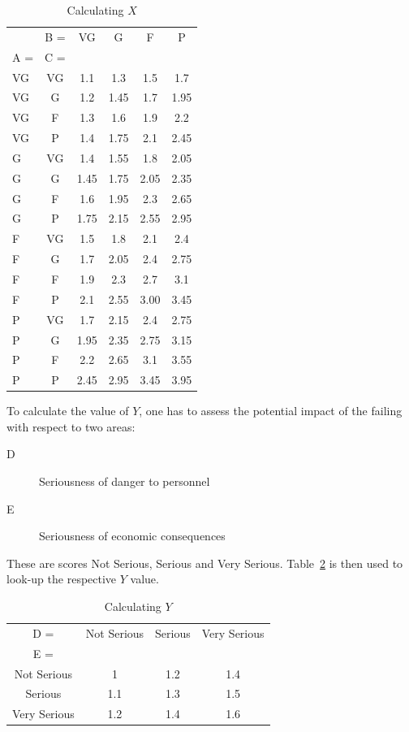 \begin{table}[h!]
  \caption{Calculating $X$}\label{tbl-pugsley-x}
  \center{}
  \begin{tabular}{l c | c c c c}
    \toprule
    & B = & VG & G & F & P \\
    A = & C = & & & & \\
    \midrule
    VG & VG & 1.1 & 1.3 & 1.5 & 1.7 \\
    VG & G & 1.2 & 1.45 & 1.7 & 1.95 \\
    VG & F & 1.3 & 1.6 & 1.9 & 2.2 \\
    VG & P & 1.4 & 1.75 & 2.1 & 2.45 \\
    \midrule
    G & VG & 1.4 & 1.55 & 1.8 & 2.05 \\
    G & G & 1.45 & 1.75 & 2.05 & 2.35 \\
    G & F & 1.6 & 1.95 & 2.3 & 2.65 \\
    G & P & 1.75 & 2.15 & 2.55 & 2.95 \\
    \midrule
    F & VG & 1.5 & 1.8 & 2.1 & 2.4 \\
    F & G & 1.7 & 2.05 & 2.4 & 2.75 \\
    F & F & 1.9 & 2.3 & 2.7 & 3.1 \\
    F & P & 2.1 & 2.55 & 3.00 & 3.45 \\
    \midrule
    P & VG & 1.7 & 2.15 & 2.4 & 2.75 \\
    P & G & 1.95 & 2.35 & 2.75 & 3.15 \\
    P & F & 2.2 & 2.65 & 3.1 & 3.55 \\
    P & P & 2.45 & 2.95 & 3.45 & 3.95 \\
    \bottomrule
  \end{tabular}
\end{table}

To calculate the value of \(Y\), one has to assess the potential impact of the failing with respect to two areas:

\begin{description}
  \item[D] Seriousness of danger to personnel
  \item[E] Seriousness of economic consequences
\end{description}

These are scores Not Serious, Serious and Very Serious. Table~\ref{tbl-pugsley-y} is then used to look-up the respective \(Y\) value.

\begin{table}
  \caption{Calculating $Y$}\label{tbl-pugsley-y}
  \center{}
  \begin{tabular}{c c c c}
    \toprule
    D = & Not Serious & Serious & Very Serious \\
    E = & & & \\
    \midrule
    Not Serious & 1 & 1.2 & 1.4 \\
    Serious & 1.1 & 1.3 & 1.5 \\
    Very Serious & 1.2 & 1.4 & 1.6 \\
    \bottomrule
  \end{tabular}
\end{table}

